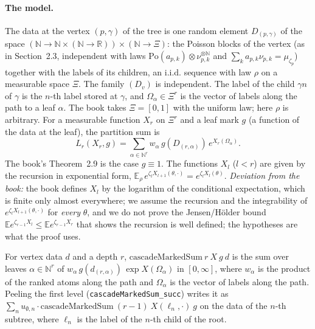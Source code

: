 \paragraph{The model.}
The data at the vertex $(p,\gamma)$ of the tree is one random element $D_{(p,\gamma)}$ of the space
$(\mathbb N\to\mathbb N\times(\mathbb N\to\mathbb R))\times(\mathbb N\to\Xi)$: the Poisson blocks
of the vertex (as in Section~2.3, independent with laws $\mathrm{Po}(a_{p,k})\otimes\nu_{p,k}^{\otimes\mathbb N}$ and
$\sum_ka_{p,k}\nu_{p,k}=\mu_{\zeta_p}$) together with the labels of its children, an i.i.d. sequence
with law $\rho$ on a measurable space $\Xi$. The family $(D_v)$ is independent. The label of the child
$\gamma n$ of $\gamma$ is the $n$-th label stored at $\gamma$, and
$\Omega_\alpha\in\Xi^r$ is the vector of labels along the path to a leaf $\alpha$. The book takes
$\Xi=[0,1]$ with the uniform law; here $\rho$ is arbitrary. For a measurable function $X_r$ on
$\Xi^r$ and a leaf mark $g$ (a function of the data at the leaf), the partition sum is
\[
  L_r(X_r,g)=\sum_{\alpha\in\mathbb N^r}w_\alpha\,g(D_{(r,\alpha)})\,e^{X_r(\Omega_\alpha)} .
\]
The book's Theorem~2.9 is the case $g\equiv1$. The functions $X_l$ ($l<r$) are given by the
recursion in exponential form, $\mathbb E_\rho\,e^{\zeta_lX_{l+1}(\theta,\cdot)}=e^{\zeta_lX_l(\theta)}$.
\emph{Deviation from the book:} the book defines $X_l$ by the logarithm of the conditional
expectation, which is finite only almost everywhere; we assume the recursion and the integrability of
$e^{\zeta_lX_{l+1}(\theta,\cdot)}$ for \emph{every} $\theta$, and we do not prove the Jensen/H\"older bound
$\mathbb E e^{\zeta_{r-1}X_l}\le\mathbb E e^{\zeta_{r-1}X_r}$ that shows the recursion is well
defined; the hypotheses are what the proof uses.

\begin{definition}\label{def:sg:cascade-marked-sum}
  \leanok
For vertex data $d$ and a depth $r$, $\mathrm{cascadeMarkedSum}\ r\ X\ g\ d$ is the sum over leaves
$\alpha\in\mathbb N^r$ of $w_\alpha\,g(d_{(r,\alpha)})\,\exp X(\Omega_\alpha)$ in $[0,\infty]$, where
$w_\alpha$ is the product of the ranked atoms along the path and $\Omega_\alpha$ is the vector of
labels along the path. Peeling the first level
(\texttt{cascadeMarkedSum\_succ}) writes it as
$\sum_n u_{\emptyset,n}\cdot\mathrm{cascadeMarkedSum}\ (r-1)\ X(\ell_n,\cdot)\ g$ on the data of the
$n$-th subtree, where $\ell_n$ is the label of the $n$-th child of the root.
\end{definition}

